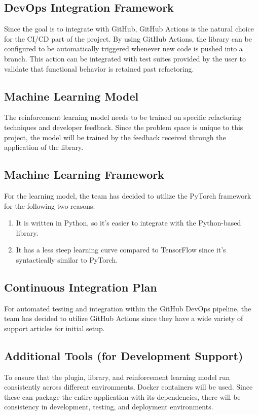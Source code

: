 \documentclass{article}
\begin{document}
\subsection{DevOps Integration Framework}
Since the goal is to integrate with GitHub, GitHub Actions is the natural choice for the CI/CD part of the project. By using GitHub Actions, the library can be configured to be automatically triggered whenever new code is pushed into a branch. This action can be integrated with test suites provided by the user to validate that functional behavior is retained past refactoring.

\subsection{Machine Learning Model}
The reinforcement learning model needs to be trained on specific refactoring techniques and developer feedback. Since the problem space is unique to this project, the model will be trained by the feedback received through the application of the library.

\subsection{Machine Learning Framework}
For the learning model, the team has decided to utilize the PyTorch framework for the following two reasons:
\begin{enumerate}
    \item It is written in Python, so it's easier to integrate with the Python-based library.
    \item It has a less steep learning curve compared to TensorFlow since it’s syntactically similar to PyTorch.
\end{enumerate}

\subsection{Continuous Integration Plan}
For automated testing and integration within the GitHub DevOps pipeline, the team has decided to utilize GitHub Actions since they have a wide variety of support articles for initial setup.

\subsection{Additional Tools (for Development Support)}
To ensure that the plugin, library, and reinforcement learning model run consistently across different environments, Docker containers will be used. Since these can package the entire application with its dependencies, there will be consistency in development, testing, and deployment environments.
\end{document}
